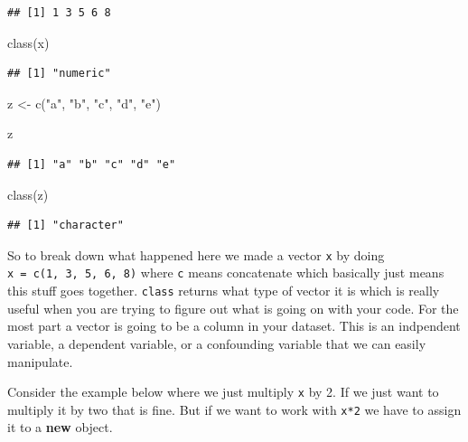 \documentclass[]{tufte-handout}
\newenvironment{Shaded}{}{}
\newcommand{\FunctionTok}[1]{\textcolor[rgb]{0.02,0.16,0.49}{#1}}
\newcommand{\NormalTok}[1]{#1}
\newcommand{\OtherTok}[1]{\textcolor[rgb]{0.00,0.44,0.13}{#1}}
\newcommand{\StringTok}[1]{\textcolor[rgb]{0.25,0.44,0.63}{#1}}
\begin{document}
\begin{verbatim}
## [1] 1 3 5 6 8
\end{verbatim}

\begin{Shaded}
\begin{Highlighting}[]
\FunctionTok{class}\NormalTok{(x)}
\end{Highlighting}
\end{Shaded}

\begin{verbatim}
## [1] "numeric"
\end{verbatim}

\begin{Shaded}
\begin{Highlighting}[]
\NormalTok{z }\OtherTok{\textless{}{-}} \FunctionTok{c}\NormalTok{(}\StringTok{"a"}\NormalTok{, }\StringTok{"b"}\NormalTok{, }\StringTok{"c"}\NormalTok{, }\StringTok{"d"}\NormalTok{, }\StringTok{"e"}\NormalTok{)}

\NormalTok{z}
\end{Highlighting}
\end{Shaded}

\begin{verbatim}
## [1] "a" "b" "c" "d" "e"
\end{verbatim}

\begin{Shaded}
\begin{Highlighting}[]
\FunctionTok{class}\NormalTok{(z)}
\end{Highlighting}
\end{Shaded}

\begin{verbatim}
## [1] "character"
\end{verbatim}

So to break down what happened here we made a vector \texttt{x} by doing
\texttt{x\ =\ c(1,\ 3,\ 5,\ 6,\ 8)} where \texttt{c} means concatenate
which basically just means this stuff goes together. \texttt{class}
returns what type of vector it is which is really useful when you are
trying to figure out what is going on with your code. For the most part
a vector is going to be a column in your dataset. This is an indpendent
variable, a dependent variable, or a confounding variable that we can
easily manipulate.

Consider the example below where we just multiply \texttt{x} by 2. If we
just want to multiply it by two that is fine. But if we want to work
with \texttt{x*2} we have to assign it to a \textbf{new} object.
\end{document}
